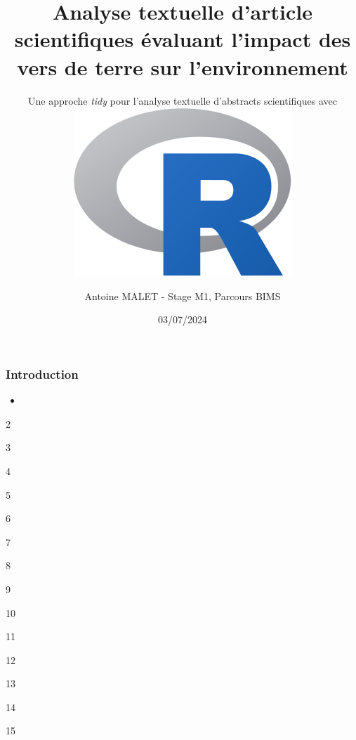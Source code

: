 \documentclass{beamer}
\title{Analyse textuelle d’article scientifiques évaluant l’impact des vers de terre sur l’environnement}
\subtitle{Une approche \textit{tidy} pour l'analyse textuelle d'abstracts scientifiques avec \includegraphics[scale=0.04]{R_logo.svg.png}}
\author{Antoine MALET - Stage M1, Parcours BIMS}
\institute{Campus Agro Paris-Saclay - Unité Mathématiques et Informatique Appliqués}
\date{03/07/2024}
\begin{document}
\begin{frame}
    \titlepage
\end{frame}

\begin{frame}
    \frametitle[Introduction]{Introduction}
    \begin{itemize}
        \item 
    \end{itemize}
\end{frame}
\begin{frame}
    2
\end{frame}
\begin{frame}
    3
\end{frame}
\begin{frame}
    4
\end{frame}
\begin{frame}
    5
\end{frame}
\begin{frame}
    6
\end{frame}
\begin{frame}
    7
\end{frame}
\begin{frame}
    8
\end{frame}
\begin{frame}
    9
\end{frame}
\begin{frame}
    10
\end{frame}
\begin{frame}
    11
\end{frame}
\begin{frame}
    12
\end{frame}
\begin{frame}
    13
\end{frame}
\begin{frame}
    14
\end{frame}
\begin{frame}
    15
\end{frame}
\end{document}
